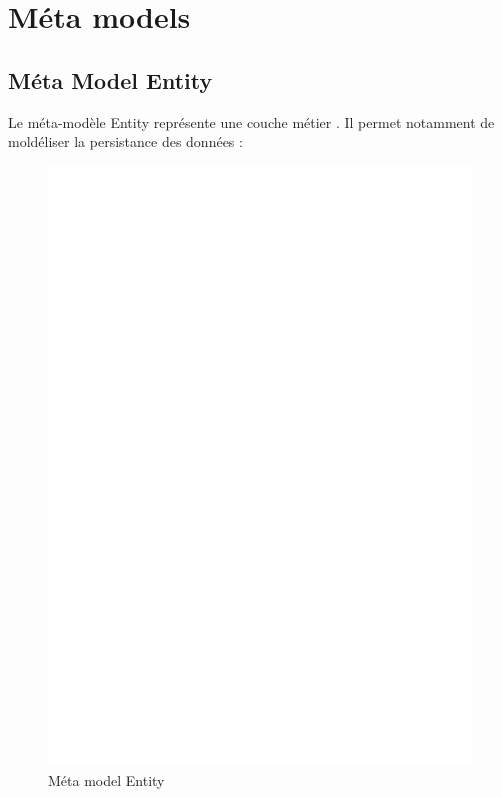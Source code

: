 \section{Méta models}\label{sec:met}

\subsection{Méta Model Entity}\label{sub:ent}
Le méta-modèle Entity représente une couche \og métier \fg{}. Il permet notamment de moldéliser la persistance des données :  

\begin{figure}[htb]
  \centering
  \includegraphics[scale=.3]{img/Entity.eps}
  \caption{Méta model Entity}
  \label{fig:ent}
\end{figure}

